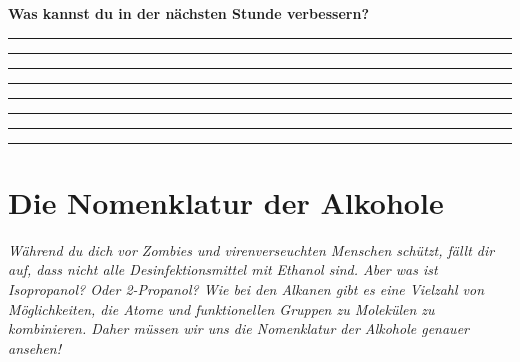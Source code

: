 \documentclass{scrartcl}  %
\begin{document}
\begin{center}
\begin{tcolorbox}
\begin{center}
\begin{tikzpicture}[scale=1]
							\end{tikzpicture}
						\end{center}
						\textbf{{\Large Was kannst du in der nächsten Stunde verbessern?}}
						\begin{center}
							\noindent\rule{12cm}{0.2pt}
							\vspace{1.1cm}
							\noindent\rule{12cm}{0.1pt}
							\vspace{1.1cm}
							\noindent\rule{12cm}{0.1pt}
							\vspace{1.1cm}
							\noindent\rule{12cm}{0.1pt}
							\vspace{1.1cm}
							\noindent\rule{12cm}{0.1pt}
							\vspace{1.1cm}
							\noindent\rule{12cm}{0.1pt}
							\vspace{1.1cm}
							\noindent\rule{12cm}{0.1pt}
							\vspace{1.1cm}
							\noindent\rule{12cm}{0.1pt}
						\end{center}
					\end{tcolorbox}
				\end{center}
								



\newpage

		\section{Die Nomenklatur der Alkohole}

			\textit{Während du dich vor Zombies und virenverseuchten Menschen schützt, fällt dir auf, dass nicht alle Desinfektionsmittel mit Ethanol sind. Aber was ist Isopropanol? Oder 2-Propanol? Wie bei den Alkanen gibt es eine Vielzahl von Möglichkeiten, die Atome und funktionellen Gruppen zu Molekülen zu kombinieren. Daher müssen wir uns die Nomenklatur der Alkohole genauer ansehen!} \newline
			
\end{document}
